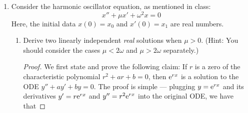 \documentclass[../psets.tex]{subfiles}
\begin{document}
\begin{enumerate}
\begin{enumerate}
\begin{proof}
            \begin{equation*}
                \boxed{\R\setminus\left\{ \frac{\pi}{2}+\pi n\mid n\in\Z \right\}}
            \end{equation*}
        \end{proof}
        \item $x'=\e[x]\sin t$.
        \begin{proof}
            By separation of variables, the solution reads
            \begin{equation*}
                \int_{x_0}^x\e[-w]\dd{w} = \int_0^t\sin\tau\dd\tau
            \end{equation*}
            The result is
            \begin{equation*}
                -\e[-x]+\e[-x_0] = 1-\cos t
                \quad\Longleftrightarrow\quad
                \boxed{x(t) = -\ln(\e[-x_0]-1+\cos t)}
            \end{equation*}
            The set of $x_0$ for which the solution is extendable to the whole of $t\geq 0$ is
            \begin{equation*}
                \boxed{\{x_0\in\R\mid x_0<\ln(1/2)\}}
            \end{equation*}
            When $x_0\geq\ln(1/2)$, the solution only exists in
            \begin{equation*}
                \boxed{\left[ 0,\arccos(1-\e[-x_0]) \right)}
            \end{equation*}
        \end{proof}
    \end{enumerate}
    \item Consider the harmonic oscillator equation, as mentioned in class:
    \begin{equation*}
        x''+\mu x'+\omega^2x = 0
    \end{equation*}
    Here, the initial data $x(0)=x_0$ and $x'(0)=x_1$ are real numbers.
    \begin{enumerate}
        \item Derive two linearly independent \emph{real} solutions when $\mu>0$. (Hint: You should consider the cases $\mu<2\omega$ and $\mu>2\omega$ separately.)
        \begin{proof}
            We first state and prove the following claim: If $r$ is a zero of the characteristic polynomial $r^2+ar+b=0$, then $\e[rx]$ is a solution to the ODE $y''+ay'+by=0$. The proof is simple --- plugging $y=\e[rx]$ and its derivatives $y'=r\e[rx]$ and $y''=r^2\e[rx]$ into the original ODE, we have that

\end{proof}
\end{enumerate}
\end{enumerate}
\end{document}
